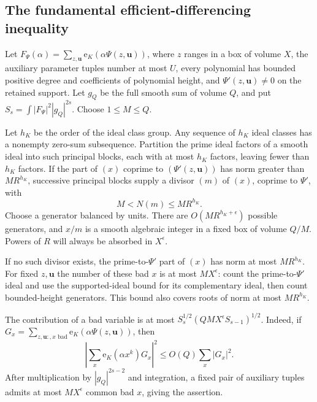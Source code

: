 \documentclass[11pt]{amsart}
\theoremstyle{definition}
\numberwithin{equation}{section}
\begin{document}
\subsection{The fundamental efficient-differencing inequality}

Let $F_\Psi(\alpha)=\sum_{z,\mathbf u}\mathrm e_K(\alpha\Psi(z,\mathbf u))$,
where $z$ ranges in a box of volume $X$, the auxiliary parameter tuples number
at most $U$, every polynomial has bounded positive degree and coefficients of
polynomial height, and $\Psi'(z,\mathbf u)\ne0$ on the retained support.
Let $g_Q$ be the full smooth sum of volume $Q$, and put
$S_s=\int|F_\Psi|^2|g_Q|^{2s}$.
Choose $1\le M\le Q$.

Let $h_K$ be the order of the ideal class group.  Any sequence of $h_K$ ideal
classes has a nonempty zero-sum subsequence.  Partition the prime ideal factors
of a smooth ideal into such principal blocks, each with at most $h_K$ factors,
leaving fewer than $h_K$ factors.  If the part of $(x)$ coprime to
$(\Psi'(z,\mathbf u))$ has norm greater than $MR^{h_K}$, successive principal
blocks supply a divisor $(m)$ of $(x)$, coprime to $\Psi'$, with
\[
 M<N(m)\le MR^{h_K}.
\]
Choose a generator balanced by units.  There are $O(MR^{h_K+\epsilon})$
possible generators, and $x/m$ is a smooth algebraic integer in a fixed box
of volume $Q/M$.  Powers of $R$ will always be absorbed in $X^\epsilon$.

If no such divisor exists, the prime-to-$\Psi'$ part of $(x)$ has norm at most
$MR^{h_K}$.  For fixed $z,\mathbf u$ the number of these bad $x$ is at most
$MX^\epsilon$: count the prime-to-$\Psi'$ ideal and use the supported-ideal
bound for its complementary ideal, then count bounded-height generators.
This bound also covers roots of norm at most $MR^{h_K}$.

The contribution of a bad variable is at most
$S_s^{1/2}(QMX^\epsilon S_{s-1})^{1/2}$.
Indeed, if
$G_x=\sum_{z,\mathbf u:,x\text{ bad}}\mathrm e_K(\alpha\Psi(z,\mathbf u))$,
then
\[
 \left|\sum_x\mathrm e_K(\alpha x^k)G_x\right|^2
 \le O(Q)\sum_x|G_x|^2.
\]
After multiplication by $|g_Q|^{2s-2}$ and integration, a fixed pair of auxiliary
tuples admits at most $MX^\epsilon$ common bad $x$, giving the assertion.
\end{document}
